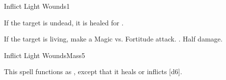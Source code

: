 \begin{spellsection}{Inflict Light Wounds}{1}
\begin{spellheader}
\end{spellheader}
\begin{spellcontent}
    \begin{spelltargetinginfo}
    \end{spelltargetinginfo}
    \begin{spelleffects}
        \spelleffect If the target is undead, it is healed for .
        \begin{spellattacktriggered}{If the target is living, make a Magic vs. Fortitude attack.}
            \spellsuccess {}.
            \spellfailure Half damage.
        \end{spellattacktriggered}
    \end{spelleffects}
\end{spellcontent}
\begin{spellfooter}
\end{spellfooter}
\end{spellsection}

\begin{spellsection}{Inflict Light Wounds}{Mass}{5}
\begin{spellheader}
\end{spellheader}
\begin{spellcontent}
    \begin{spelltargetinginfo}
    \end{spelltargetinginfo}
    \begin{spelleffects}
        \spellspecial This spell functions as , except that it heals or inflicts [d6].
    \end{spelleffects}
\end{spellcontent}
\begin{spellfooter}
\end{spellfooter}
\end{spellsection}


